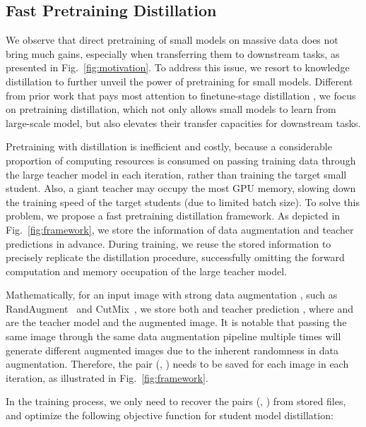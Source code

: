\documentclass[runningheads]{llncs}
\newcommand\REV[1]{#1}
\begin{document}
\vspace{-4mm}
\subsection{Fast Pretraining Distillation}
\vspace{-2mm}
\label{sec: pd}



We observe that direct pretraining of small models  on  massive  data  does  not bring much gains, especially when transferring them to downstream tasks, as presented in Fig.~\ref{fig:motivation}. To address this issue, we resort to knowledge distillation to further unveil the power of pretraining for small models. 
Different from prior work that pays most attention to finetune-stage distillation 
\cite{deit}, we focus on pretraining distillation, which not only allows small models to learn from large-scale model, but also elevates their transfer capacities for downstream tasks.

Pretraining with distillation is inefficient and costly, because a considerable proportion of computing resources is consumed on passing training data through the large teacher model in each iteration, rather than training the target small student. Also, a giant teacher may occupy the most GPU memory, slowing down the training speed of the target students (due to limited batch size). To solve this problem, we propose a fast pretraining distillation framework. As depicted in Fig.~\ref{fig:framework}, we store the information of data augmentation and teacher predictions in advance. During training, we reuse the stored information to precisely replicate the distillation procedure, successfully omitting the forward computation and \REV{memory occupation} of the large teacher model.


Mathematically, for an input image  with strong data augmentation , such as RandAugment~\cite{randaug} and CutMix~\cite{cutmix}, we store both  and teacher prediction , where  and  are the teacher model and the augmented image. It is notable that passing the same image through the same data augmentation pipeline multiple times will generate different augmented images due to the inherent randomness in data augmentation. Therefore, the pair (, ) needs to be saved for each image in each iteration, as illustrated in Fig.~\ref{fig:framework}.

In the training process, we only need to recover the pairs (, ) from stored files, and optimize the following objective function for student model distillation: 
\end{document}
